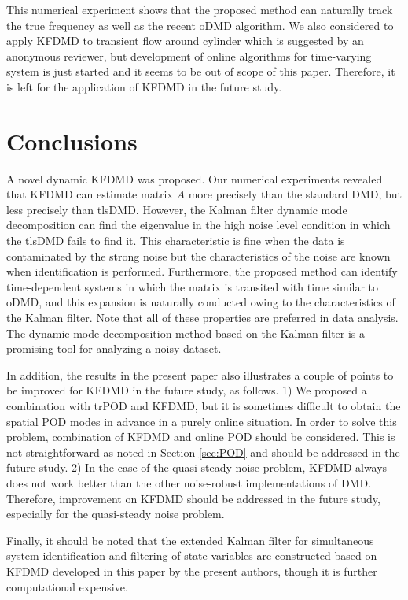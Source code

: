 \documentclass[aip,graphicx]{revtex4-1}
\begin{document}
This numerical experiment shows that the proposed method can naturally track the true frequency as well as the recent oDMD algorithm. We also considered to apply KFDMD to transient flow around cylinder which is suggested by an anonymous reviewer, but development of online algorithms for time-varying system is just started and it seems to be out of scope of this paper. Therefore, it is left for the application of KFDMD in the future study. 

\section{Conclusions}
\label{sec:Concl}
A novel dynamic KFDMD was proposed. Our numerical experiments revealed that KFDMD can estimate matrix $A$ more precisely than the standard DMD, but less precisely than tlsDMD. However, the Kalman filter dynamic mode decomposition can find the eigenvalue in the high noise level condition in which the tlsDMD fails to find it.  
This characteristic is fine when the data is contaminated by the strong noise but the characteristics of the noise are known when identification is performed.
Furthermore, the proposed method can identify time-dependent systems in which the matrix is transited with time similar to oDMD, and this expansion is naturally conducted owing to the characteristics of the Kalman filter. Note that all of these properties are preferred in data analysis. The dynamic mode decomposition method based on the Kalman filter is a promising tool for analyzing a noisy dataset. 

In addition, the results in the present paper also illustrates a couple of points to be improved for KFDMD in the future study, as follows. 1)  We proposed a combination with trPOD and KFDMD, but it is sometimes difficult to obtain the spatial POD modes in advance in a purely online situation. In order to solve this problem, combination of KFDMD and online POD should be considered. This is not straightforward as noted in Section \ref{sec:POD} and should be addressed in the future study.
2) In the case of the quasi-steady noise problem, KFDMD always does not work better than the other noise-robust implementations of DMD. Therefore, improvement on KFDMD should be addressed in the future study, especially for the quasi-steady noise problem. 

Finally, it should be noted that the extended Kalman filter for simultaneous system identification and filtering of state variables are constructed based on KFDMD developed in this paper by the present authors,\cite{Nonomura2018} though it is further computational expensive. 
\end{document}
